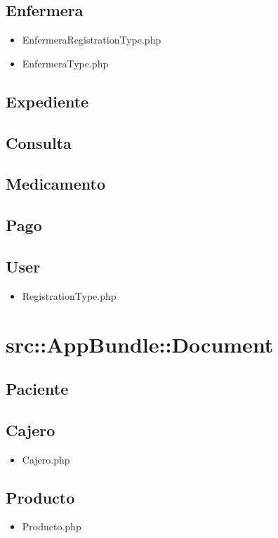 		\subsection{Enfermera}
		\begin{itemize}
		\item EnfermeraRegistrationType.php
		\item EnfermeraType.php
		\end{itemize}
		
		\subsection{Expediente}
		\subsection{Consulta}
		\subsection{Medicamento}
		\subsection{Pago}
		\subsection{User}
		\begin{itemize}
		\item RegistrationType.php
		\end{itemize}
	\newpage	
	\section{src::AppBundle::Document}
	
	\subsection{Paciente}
		\subsection{Cajero}
		\begin{itemize}
			\item Cajero.php
		\end{itemize}				
		
		\subsection{Producto}
		\begin{itemize}
			\item Producto.php
		\end{itemize}				
		
